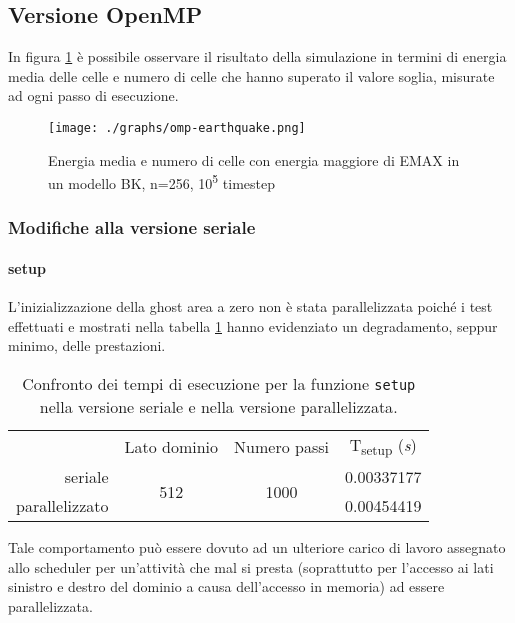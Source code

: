 \subsection{Versione OpenMP}

In figura \ref{fig:simulation1} è possibile osservare il risultato della
simulazione in termini di energia media delle celle e numero di celle che hanno
superato il valore soglia, misurate ad ogni passo di esecuzione.

\begin{figure}[!ht]
  \centering
  \texttt{[image: ./graphs/omp-earthquake.png]}
  \caption{Energia media e numero di celle con energia maggiore di EMAX in un
  modello BK, n=256, 10\textsuperscript{5} timestep}\label{fig:simulation1}
\end{figure}

\subsubsection{Modifiche alla versione seriale}

\paragraph{setup}L'inizializzazione della ghost area a zero non è stata
parallelizzata poiché i test effettuati e mostrati nella tabella
\ref{tab:parallelghostarea} hanno evidenziato un degradamento, seppur minimo,
delle prestazioni.

\begin{table}[ht]
\centering
\begin{tabular}{rccc}
\cmidrule[\heavyrulewidth]{2-4}
 & Lato dominio & Numero passi & T\textsubscript{setup} (\textit{s})\\
 \cmidrule[\lightrulewidth]{2-4}
 seriale & \multirow{2}{*}{512} & \multirow{2}{*}{1000} & 0.00337177\\
 parallelizzato &&& 0.00454419\\
\cmidrule[\heavyrulewidth]{2-4}
\end{tabular}
\caption{\label{tab:parallelghostarea}Confronto dei tempi di esecuzione per la
funzione \texttt{setup} nella versione seriale e nella versione parallelizzata.}
\end{table}

Tale comportamento può essere dovuto ad un ulteriore carico di lavoro assegnato
allo scheduler per un'attività che mal si presta (soprattutto per l'accesso ai
lati sinistro e destro del dominio a causa dell'accesso in memoria) ad essere
parallelizzata.

